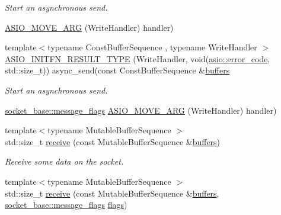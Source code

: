 \begin{DoxyCompactItemize}
\begin{DoxyCompactList}\small\item\em Start an asynchronous send. \end{DoxyCompactList}\item 
\hyperlink{classasio_1_1basic__stream__socket_a01062cf1f327c352999ef3aa1efebd98}{A\+S\+I\+O\+\_\+\+M\+O\+V\+E\+\_\+\+A\+R\+G} (Write\+Handler) handler)
\item 
{\footnotesize template$<$typename Const\+Buffer\+Sequence , typename Write\+Handler $>$ }\\\hyperlink{classasio_1_1basic__stream__socket_afcace4f7f04c4ac287edd53e23eb9985}{A\+S\+I\+O\+\_\+\+I\+N\+I\+T\+F\+N\+\_\+\+R\+E\+S\+U\+L\+T\+\_\+\+T\+Y\+P\+E} (Write\+Handler, void(\hyperlink{classasio_1_1error__code}{asio\+::error\+\_\+code}, std\+::size\+\_\+t)) async\+\_\+send(const Const\+Buffer\+Sequence \&\hyperlink{group__async__read_ga54dede45c3175148a77fe6635222c47d}{buffers}
\begin{DoxyCompactList}\small\item\em Start an asynchronous send. \end{DoxyCompactList}\item 
\hyperlink{classasio_1_1socket__base_ac3cf77465dfedfe1979b5415cf32cc94}{socket\+\_\+base\+::message\+\_\+flags} \hyperlink{classasio_1_1basic__stream__socket_a7838e53001f30c046af84c50b39700a5}{A\+S\+I\+O\+\_\+\+M\+O\+V\+E\+\_\+\+A\+R\+G} (Write\+Handler) handler)
\item 
{\footnotesize template$<$typename Mutable\+Buffer\+Sequence $>$ }\\std\+::size\+\_\+t \hyperlink{classasio_1_1basic__stream__socket_ae2f7eb55984892225ecc8670a26fd6c5}{receive} (const Mutable\+Buffer\+Sequence \&\hyperlink{group__async__read_ga54dede45c3175148a77fe6635222c47d}{buffers})
\begin{DoxyCompactList}\small\item\em Receive some data on the socket. \end{DoxyCompactList}\item 
{\footnotesize template$<$typename Mutable\+Buffer\+Sequence $>$ }\\std\+::size\+\_\+t \hyperlink{classasio_1_1basic__stream__socket_a68abffc3fc471f0dbf194f68dfef7e5c}{receive} (const Mutable\+Buffer\+Sequence \&\hyperlink{group__async__read_ga54dede45c3175148a77fe6635222c47d}{buffers}, \hyperlink{classasio_1_1socket__base_ac3cf77465dfedfe1979b5415cf32cc94}{socket\+\_\+base\+::message\+\_\+flags} \hyperlink{classasio_1_1basic__stream__socket_a49da9b10ef73407f4991c633ced27111}{flags})

\end{DoxyCompactItemize}
